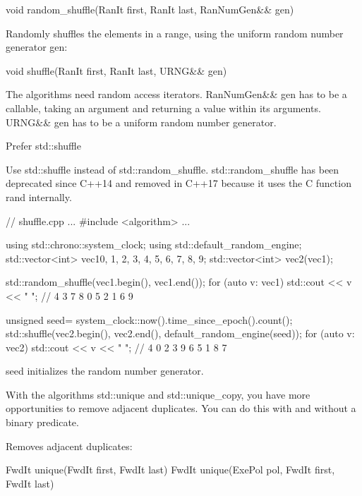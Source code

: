\begin{cpp}
void random_shuffle(RanIt first, RanIt last, RanNumGen&& gen)
\end{cpp}

Randomly shuffles the elements in a range, using the uniform random number generator gen:

\begin{cpp}
void shuffle(RanIt first, RanIt last, URNG&& gen)
\end{cpp}

The algorithms need random access iterators. RanNumGen\&\& gen has to be a callable, taking an argument and returning a value within its arguments. URNG\&\& gen has to be a uniform random number generator.

\begin{myTip}{Prefer std::shuffle}
	
Use std::shuffle instead of std::random\_shuffle. std::random\_shuffle has been deprecated since C++14 and removed in C++17 because it uses the C function rand internally.
\end{myTip}


\begin{cpp}
// shuffle.cpp
...
#include <algorithm>
...

using std::chrono::system_clock;
using std::default_random_engine;
std::vector<int> vec1{0, 1, 2, 3, 4, 5, 6, 7, 8, 9};
std::vector<int> vec2(vec1);

std::random_shuffle(vec1.begin(), vec1.end());
for (auto v: vec1) std::cout << v << " "; // 4 3 7 8 0 5 2 1 6 9

unsigned seed= system_clock::now().time_since_epoch().count();
std::shuffle(vec2.begin(), vec2.end(), default_random_engine(seed));
for (auto v: vec2) std::cout << v << " "; // 4 0 2 3 9 6 5 1 8 7
\end{cpp}

seed initializes the random number generator.


With the algorithms std::unique and std::unique\_copy, you have more opportunities to remove adjacent duplicates. You can do this with and without a binary predicate.

Removes adjacent duplicates:

\begin{cpp}
FwdIt unique(FwdIt first, FwdIt last)
FwdIt unique(ExePol pol, FwdIt first, FwdIt last)
\end{cpp}

